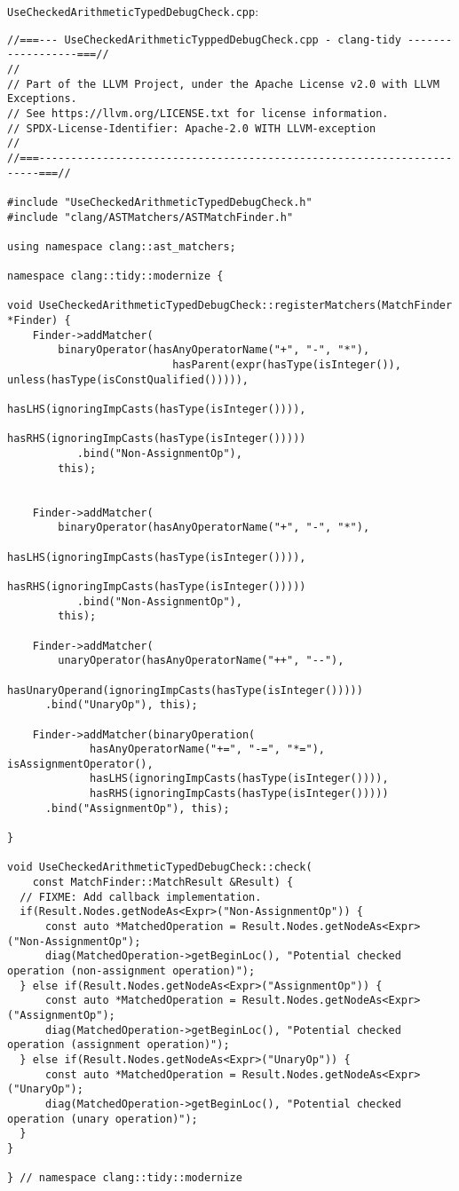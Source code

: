 \texttt{UseCheckedArithmeticTypedDebugCheck.cpp}:
{\scriptsize
\begin{verbatim}
//===--- UseCheckedArithmeticTyppedDebugCheck.cpp - clang-tidy ------------------===//
//
// Part of the LLVM Project, under the Apache License v2.0 with LLVM Exceptions.
// See https://llvm.org/LICENSE.txt for license information.
// SPDX-License-Identifier: Apache-2.0 WITH LLVM-exception
//
//===----------------------------------------------------------------------===//

#include "UseCheckedArithmeticTypedDebugCheck.h"
#include "clang/ASTMatchers/ASTMatchFinder.h"

using namespace clang::ast_matchers;

namespace clang::tidy::modernize {

void UseCheckedArithmeticTypedDebugCheck::registerMatchers(MatchFinder *Finder) {
    Finder->addMatcher(
        binaryOperator(hasAnyOperatorName("+", "-", "*"),
                          hasParent(expr(hasType(isInteger()), unless(hasType(isConstQualified())))),
                          hasLHS(ignoringImpCasts(hasType(isInteger()))),
                          hasRHS(ignoringImpCasts(hasType(isInteger()))))
           .bind("Non-AssignmentOp"),
        this);


    Finder->addMatcher(
        binaryOperator(hasAnyOperatorName("+", "-", "*"),
                          hasLHS(ignoringImpCasts(hasType(isInteger()))),
                          hasRHS(ignoringImpCasts(hasType(isInteger()))))
           .bind("Non-AssignmentOp"),
        this);

    Finder->addMatcher(
        unaryOperator(hasAnyOperatorName("++", "--"),
                       hasUnaryOperand(ignoringImpCasts(hasType(isInteger()))))
      .bind("UnaryOp"), this);

    Finder->addMatcher(binaryOperation(
             hasAnyOperatorName("+=", "-=", "*="), isAssignmentOperator(),
             hasLHS(ignoringImpCasts(hasType(isInteger()))),
             hasRHS(ignoringImpCasts(hasType(isInteger()))))
      .bind("AssignmentOp"), this);

}

void UseCheckedArithmeticTypedDebugCheck::check(
    const MatchFinder::MatchResult &Result) {
  // FIXME: Add callback implementation.
  if(Result.Nodes.getNodeAs<Expr>("Non-AssignmentOp")) {
	  const auto *MatchedOperation = Result.Nodes.getNodeAs<Expr>("Non-AssignmentOp");
	  diag(MatchedOperation->getBeginLoc(), "Potential checked operation (non-assignment operation)");
  } else if(Result.Nodes.getNodeAs<Expr>("AssignmentOp")) {
	  const auto *MatchedOperation = Result.Nodes.getNodeAs<Expr>("AssignmentOp");
	  diag(MatchedOperation->getBeginLoc(), "Potential checked operation (assignment operation)");
  } else if(Result.Nodes.getNodeAs<Expr>("UnaryOp")) {
	  const auto *MatchedOperation = Result.Nodes.getNodeAs<Expr>("UnaryOp");
	  diag(MatchedOperation->getBeginLoc(), "Potential checked operation (unary operation)");
  }
}

} // namespace clang::tidy::modernize
 
\end{verbatim}

}
